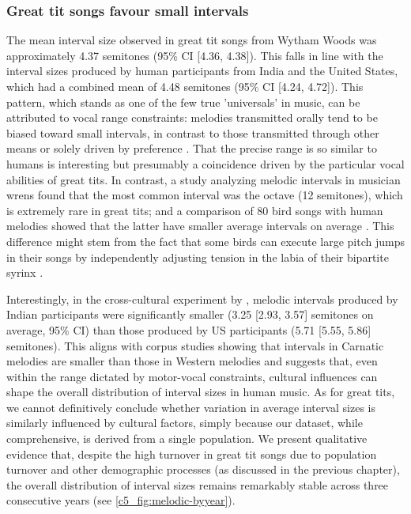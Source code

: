 \subsubsection{Great tit songs favour small intervals}

The mean interval size observed in great tit songs from Wytham Woods was approximately 4.37 semitones (95\% CI [4.36, 4.38]). This falls in line with the interval sizes produced by human participants from India and the United States, which had a combined mean of 4.48 semitones (95\% CI [4.24, 4.72]). This pattern, which stands as one of the few true 'universals' in music, can be attributed to vocal range constraints: melodies transmitted orally tend to be biased toward small intervals, in contrast to those transmitted through other means or solely driven by preference \textcite{anglada-tort2023}. That the precise range is so similar to humans is interesting but presumably a coincidence driven by the particular vocal abilities of great tits. In contrast, a study analyzing melodic intervals in musician wrens \autocite{doolittle2012} found that the most common interval was the octave (12 semitones), which is extremely rare in great tits; and a comparison of 80 bird songs with human melodies showed that the latter have smaller average intervals on average \autocite{tierney2011a}. This difference might stem from the fact that some birds can execute large pitch jumps in their songs by independently adjusting tension in the labia of their bipartite syrinx \autocite{suthers2004}.

Interestingly, in the cross-cultural experiment by \textcite{anglada-tort2023}, melodic intervals produced by Indian participants were significantly smaller (3.25 [2.93, 3.57] semitones on average, 95\% CI) than those produced by US participants (5.71 [5.55, 5.86] semitones). This aligns with corpus studies showing that intervals in Carnatic melodies are smaller than those in Western melodies \autocite{bowling2012} and suggests that, even within the range dictated by motor-vocal constraints, cultural influences can shape the overall distribution of interval sizes in human music. As for great tits, we cannot definitively conclude whether variation in average interval sizes is similarly influenced by cultural factors, simply because our dataset, while comprehensive, is derived from a single population. We present qualitative evidence that, despite the high turnover in great tit songs due to population turnover and other demographic processes (as discussed in the previous chapter), the overall distribution of interval sizes remains remarkably stable across three consecutive years (see \autoref{c5_fig:melodic-byyear}).

